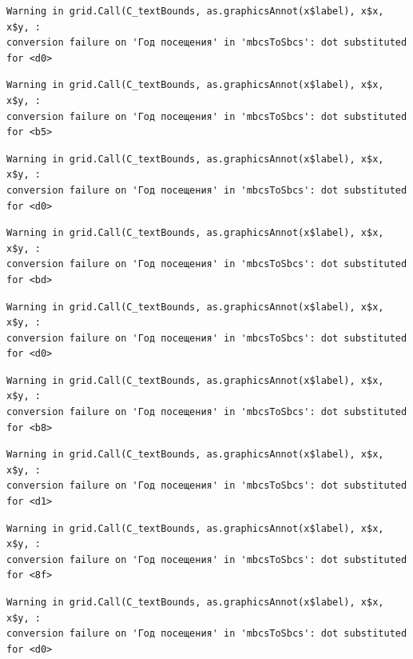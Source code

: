 \documentclass[
  letterpaper,
  DIV=11,
  numbers=noendperiod]{scrartcl}
\begin{document}
\begin{verbatim}
Warning in grid.Call(C_textBounds, as.graphicsAnnot(x$label), x$x, x$y, :
conversion failure on 'Год посещения' in 'mbcsToSbcs': dot substituted for <d0>
\end{verbatim}

\begin{verbatim}
Warning in grid.Call(C_textBounds, as.graphicsAnnot(x$label), x$x, x$y, :
conversion failure on 'Год посещения' in 'mbcsToSbcs': dot substituted for <b5>
\end{verbatim}

\begin{verbatim}
Warning in grid.Call(C_textBounds, as.graphicsAnnot(x$label), x$x, x$y, :
conversion failure on 'Год посещения' in 'mbcsToSbcs': dot substituted for <d0>
\end{verbatim}

\begin{verbatim}
Warning in grid.Call(C_textBounds, as.graphicsAnnot(x$label), x$x, x$y, :
conversion failure on 'Год посещения' in 'mbcsToSbcs': dot substituted for <bd>
\end{verbatim}

\begin{verbatim}
Warning in grid.Call(C_textBounds, as.graphicsAnnot(x$label), x$x, x$y, :
conversion failure on 'Год посещения' in 'mbcsToSbcs': dot substituted for <d0>
\end{verbatim}

\begin{verbatim}
Warning in grid.Call(C_textBounds, as.graphicsAnnot(x$label), x$x, x$y, :
conversion failure on 'Год посещения' in 'mbcsToSbcs': dot substituted for <b8>
\end{verbatim}

\begin{verbatim}
Warning in grid.Call(C_textBounds, as.graphicsAnnot(x$label), x$x, x$y, :
conversion failure on 'Год посещения' in 'mbcsToSbcs': dot substituted for <d1>
\end{verbatim}

\begin{verbatim}
Warning in grid.Call(C_textBounds, as.graphicsAnnot(x$label), x$x, x$y, :
conversion failure on 'Год посещения' in 'mbcsToSbcs': dot substituted for <8f>
\end{verbatim}

\begin{verbatim}
Warning in grid.Call(C_textBounds, as.graphicsAnnot(x$label), x$x, x$y, :
conversion failure on 'Год посещения' in 'mbcsToSbcs': dot substituted for <d0>
\end{verbatim}
\end{document}
